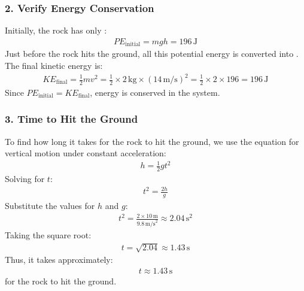 \documentclass[letterpaper,10pt,english]{jupyterBook}
\begin{document}
\subsubsection{2. Verify Energy Conservation}
\label{\detokenize{prerequisites:verify-energy-conservation}}
\sphinxAtStartPar
Initially, the rock has only :
\begin{equation*}
\begin{split}
PE_\text{initial} = mgh = 196 \, \text{J}
\end{split}
\end{equation*}
\sphinxAtStartPar
Just before the rock hits the ground, all this potential energy is converted into . The final kinetic energy is:
\begin{equation*}
\begin{split}
KE_\text{final} = \frac{1}{2} m v^2 = \frac{1}{2} \times 2 \, \text{kg} \times (14 \, \text{m/s})^2 = \frac{1}{2} \times 2 \times 196 = 196 \, \text{J}
\end{split}
\end{equation*}
\sphinxAtStartPar
Since \(PE_\text{initial} = KE_\text{final}\), energy is conserved in the system.


\subsubsection{3. Time to Hit the Ground}
\label{\detokenize{prerequisites:time-to-hit-the-ground}}
\sphinxAtStartPar
To find how long it takes for the rock to hit the ground, we use the equation for vertical motion under constant acceleration:
\begin{equation*}
\begin{split}
h = \frac{1}{2} g t^2
\end{split}
\end{equation*}
\sphinxAtStartPar
Solving for \(t\):
\begin{equation*}
\begin{split}
t^2 = \frac{2h}{g}
\end{split}
\end{equation*}
\sphinxAtStartPar
Substitute the values for \(h\) and \(g\):
\begin{equation*}
\begin{split}
t^2 = \frac{2 \times 10 \, \text{m}}{9.8 \, \text{m/s}^2} \approx 2.04 \, \text{s}^2
\end{split}
\end{equation*}
\sphinxAtStartPar
Taking the square root:
\begin{equation*}
\begin{split}
t = \sqrt{2.04} \approx 1.43 \, \text{s}
\end{split}
\end{equation*}
\sphinxAtStartPar
Thus, it takes approximately:
\begin{equation*}
\begin{split}
t \approx 1.43 \, \text{s}
\end{split}
\end{equation*}
\sphinxAtStartPar
for the rock to hit the ground.
\end{document}
